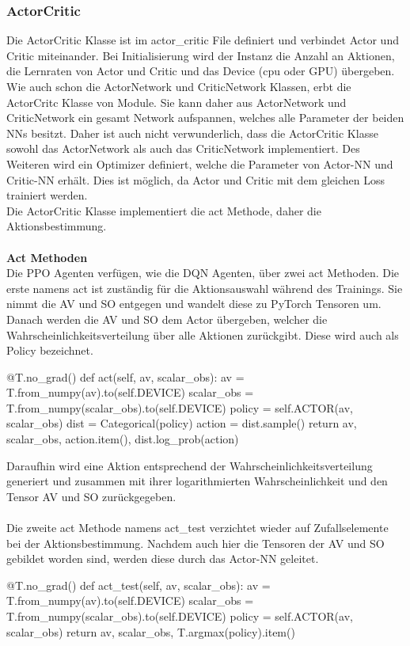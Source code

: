 \subsubsection{ActorCritic} \label{sec:Implementierung_ActorCritic}
Die ActorCritic Klasse ist im actor\_critic File definiert und verbindet Actor und Critic miteinander. Bei Initialisierung wird der Instanz die Anzahl an Aktionen, die Lernraten von Actor und Critic und das Device (cpu oder GPU) übergeben.\\
Wie auch schon die ActorNetwork und CriticNetwork Klassen, erbt die ActorCritc Klasse von Module. Sie kann daher aus ActorNetwork und CriticNetwork ein gesamt Network aufspannen, welches alle Parameter der beiden NNs besitzt. Daher ist auch nicht verwunderlich, dass die ActorCritic Klasse sowohl das ActorNetwork als auch das CriticNetwork implementiert. Des Weiteren wird ein Optimizer definiert, welche die Parameter von Actor-NN und Critic-NN erhält. Dies ist möglich, da Actor und Critic mit dem gleichen Loss trainiert werden.\\
Die ActorCritic Klasse implementiert die act Methode, daher die Aktionsbestimmung.\\
\\\textbf{Act Methoden}\\
Die PPO Agenten verfügen, wie die DQN Agenten, über zwei act Methoden. Die erste namens act ist zuständig für die Aktionsauswahl während des Trainings. Sie nimmt die AV und SO entgegen und wandelt diese zu PyTorch Tensoren um. Danach werden die AV und SO dem Actor übergeben, welcher die Wahrscheinlichkeitsverteilung über alle Aktionen zurückgibt. Diese wird auch als Policy bezeichnet.
\begin{python}
	@T.no_grad()
	def act(self, av, scalar_obs):
		av = T.from_numpy(av).to(self.DEVICE)
		scalar_obs = T.from_numpy(scalar_obs).to(self.DEVICE)
		policy = self.ACTOR(av, scalar_obs)
		dist = Categorical(policy)
		action = dist.sample()
		return av, scalar_obs, action.item(), dist.log_prob(action)
\end{python}
Daraufhin wird eine Aktion entsprechend der Wahrscheinlichkeitsverteilung generiert und zusammen mit ihrer logarithmierten Wahrscheinlichkeit und den Tensor AV und SO zurückgegeben.\\
\\Die zweite act Methode namens act\_test verzichtet wieder auf Zufallselemente bei der Aktionsbestimmung. Nachdem auch hier die Tensoren der AV und SO gebildet worden sind, werden diese durch das Actor-NN geleitet.
\begin{python}
 	@T.no_grad()
 	def act_test(self, av, scalar_obs):
	 	av = T.from_numpy(av).to(self.DEVICE)
	 	scalar_obs = T.from_numpy(scalar_obs).to(self.DEVICE)
	 	policy = self.ACTOR(av, scalar_obs)
	 	return av, scalar_obs, T.argmax(policy).item()
\end{python}
